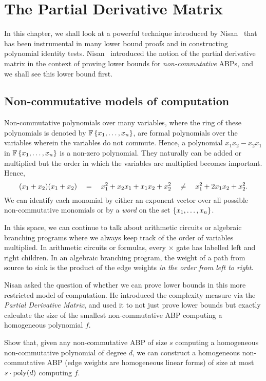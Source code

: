 \chapter{The Partial Derivative Matrix}\label{chap:evalDim}

In this chapter, we shall look at a powerful technique introduced by Nisan~\cite{nis91} that has been instrumental in many lower bound proofs and in constructing polynomial identity tests.
Nisan~\cite{nis91} introduced the notion of the partial derivative matrix in the context of proving lower bounds for
\emph{non-commutative} ABPs, and we shall see this lower bound first.

\section{Non-commutative models of computation}

Non-commutative polynomials over many variables, where the ring of these polynomials is denoted by $\mathbb{F}\left\{x_1,\ldots, x_n\right\}$, are formal polynomials over the variables wherein the variables do not commute.
Hence, a polynomial $x_1x_2 - x_2x_1$ in $\mathbb{F}\left\{x_1,\ldots, x_n\right\}$ is a non-zero polynomial.
They naturally can be added or multiplied but the order in which the variables are multiplied becomes important.
Hence,
\[
(x_1 + x_2)(x_1 + x_2) \quad = \quad x_1^2 + x_2x_1 + x_1x_2 + x_2^2 \quad \neq \quad x_1^2 + 2x_1x_2 + x_2^2.
\]
We can identify each monomial by either an exponent vector over all possible non-commutative monomials or by a \emph{word} on the set $\left\{x_1,\ldots, x_n\right\}$. 

In this space, we can continue to talk about arithmetic circuits or algebraic branching programs where we always keep track of the order of variables multiplied.
In arithmetic circuits or formulas, every $\times$ gate has labelled left and right children.
In an algebraic branching program, the weight of a path from source to sink is the product of the edge weights \emph{in the order from left to right}.

Nisan \cite{nis91} asked the question of whether we can prove lower bounds in this more restricted model of computation. He introduced the complexity measure via the \emph{Partial Derivative Matrix}, and used it to not just prove lower bounds but exactly calculate the size of the smallest non-commutative ABP computing a homogeneous polynomial $f$. \\

\begin{exercise}
Show that, given any non-commutative ABP of size $s$ computing a homogeneous non-commutative polynomial of degree $d$, we can construct a homogeneous non-commutative ABP (edge weights are homogeneous linear forms) of size at most $s \cdot \operatorname{poly}(d)$ computing $f$. 
\end{exercise}


